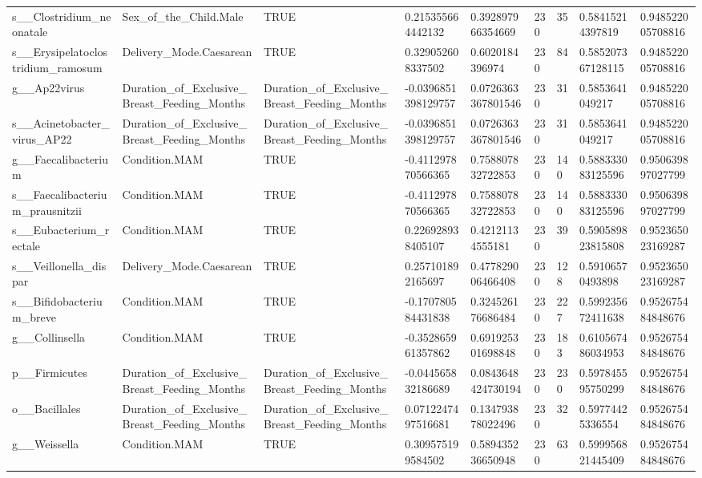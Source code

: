 \begin{longtable}{lllllllll}
s\_\_Clostridium\_neonatale & Sex\_of\_the\_Child.Male & TRUE & 0.215355664442132 & 0.392897966354669 & 230 & 35 & 0.58415214397819 & 0.948522005708816 \\
s\_\_Erysipelatoclostridium\_ramosum & Delivery\_Mode.Caesarean & TRUE & 0.329052608337502 & 0.6020184396974 & 230 & 84 & 0.585207367128115 & 0.948522005708816 \\
g\_\_Ap22virus & Duration\_of\_Exclusive\_Breast\_Feeding\_Months & Duration\_of\_Exclusive\_Breast\_Feeding\_Months & -0.0396851398129757 & 0.0726363367801546 & 230 & 31 & 0.5853641049217 & 0.948522005708816 \\
s\_\_Acinetobacter\_virus\_AP22 & Duration\_of\_Exclusive\_Breast\_Feeding\_Months & Duration\_of\_Exclusive\_Breast\_Feeding\_Months & -0.0396851398129757 & 0.0726363367801546 & 230 & 31 & 0.5853641049217 & 0.948522005708816 \\
g\_\_Faecalibacterium & Condition.MAM & TRUE & -0.411297870566365 & 0.758807832722853 & 230 & 140 & 0.588333083125596 & 0.950639897027799 \\
s\_\_Faecalibacterium\_prausnitzii & Condition.MAM & TRUE & -0.411297870566365 & 0.758807832722853 & 230 & 140 & 0.588333083125596 & 0.950639897027799 \\
s\_\_Eubacterium\_rectale & Condition.MAM & TRUE & 0.226928938405107 & 0.42121134555181 & 230 & 39 & 0.590589823815808 & 0.952365023169287 \\
s\_\_Veillonella\_dispar & Delivery\_Mode.Caesarean & TRUE & 0.257101892165697 & 0.477829006466408 & 230 & 128 & 0.59106570493898 & 0.952365023169287 \\
s\_\_Bifidobacterium\_breve & Condition.MAM & TRUE & -0.170780584431838 & 0.324526176686484 & 230 & 227 & 0.599235672411638 & 0.952675484848676 \\
g\_\_Collinsella & Condition.MAM & TRUE & -0.352865961357862 & 0.691925301698848 & 230 & 183 & 0.610567486034953 & 0.952675484848676 \\
p\_\_Firmicutes & Duration\_of\_Exclusive\_Breast\_Feeding\_Months & Duration\_of\_Exclusive\_Breast\_Feeding\_Months & -0.044565832186689 & 0.0843648424730194 & 230 & 230 & 0.597845595750299 & 0.952675484848676 \\
o\_\_Bacillales & Duration\_of\_Exclusive\_Breast\_Feeding\_Months & Duration\_of\_Exclusive\_Breast\_Feeding\_Months & 0.0712247497516681 & 0.134793878022496 & 230 & 32 & 0.59774425336554 & 0.952675484848676 \\
g\_\_Weissella & Condition.MAM & TRUE & 0.309575199584502 & 0.589435236650948 & 230 & 63 & 0.599956821445409 & 0.952675484848676 \\

\end{longtable}
